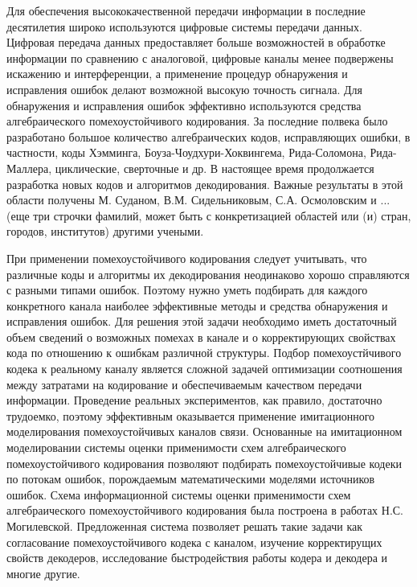 \documentclass[twoside,12pt]{article}
\begin{document}
Для обеспечения высококачественной передачи информации в последние десятилетия широко используются цифровые системы передачи данных. Цифровая передача данных предоставляет больше возможностей в обработке информации по сравнению с аналоговой, цифровые каналы менее подвержены искажению и интерференции, а применение процедур обнаружения и исправления ошибок делают возможной высокую точность сигнала. Для обнаружения и исправления ошибок эффективно используются средства алгебраического помехоустойчивого кодирования. За последние полвека было разработано большое количество алгебраических кодов, исправляющих ошибки, в частности,  коды Хэмминга, Боуза-Чоудхури-Хоквингема, Рида-Соломона, Рида-Маллера, циклические, сверточные и др. В настоящее время продолжается разработка новых кодов и алгоритмов декодирования. Важные результаты в этой области получены М. Суданом, В.М. Сидельниковым, С.А. Осмоловским и ... (еще три строчки фамилий, может быть с конкретизацией областей или (и) стран, городов, институтов) другими учеными.

При применении помехоустойчивого кодирования следует учитывать, что различные коды и алгоритмы их декодирования неодинаково хорошо справляются с разными типами ошибок. Поэтому нужно уметь подбирать для каждого конкретного канала наиболее эффективные методы и средства обнаружения и исправления ошибок. Для решения этой задачи необходимо иметь достаточный объем сведений о возможных помехах в канале и о корректирующих свойствах кода по отношению к ошибкам различной структуры. Подбор помехоустйчивого кодека к реальному каналу является сложной задачей оптимизации соотношения между затратами на кодирование и обеспечиваемым качеством передачи информации. Проведение реальных экспериментов, как правило, достаточно трудоемко, поэтому эффективным оказывается применение имитационного моделирования помехоустойчивых каналов связи. Основанные на имитационном моделировании системы оценки применимости схем алгебраического помехоустойчивого кодирования позволяют подбирать помехоустойчивые кодеки по потокам ошибок, порождаемым математическими моделями источников ошибок. Схема информационной системы оценки применимости схем алгебраического помехоустойчивого кодирования была построена в работах Н.С. Могилевской. Предложенная система позволяет решать такие задачи как согласование помехоустойчивого кодека с каналом, изучение корректирущих свойств декодеров, исследование быстродействия работы кодера и декодера и многие другие.
\end{document}
